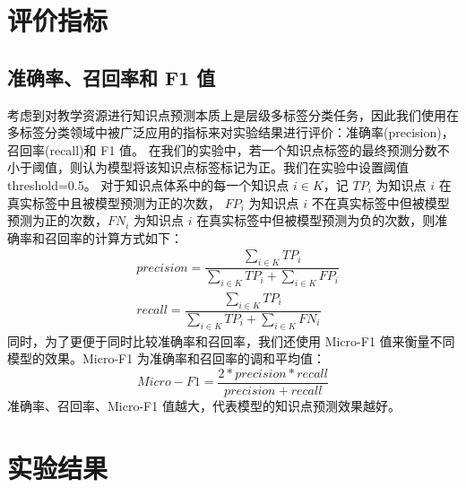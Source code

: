 \section{评价指标}
    \subsection{准确率、召回率和 F1 值}
    考虑到对教学资源进行知识点预测本质上是层级多标签分类任务，因此我们使用在多标签分类领域中被广泛应用的指标来对实验结果进行评价：准确率(precision)，召回率(recall)和 F1 值。
    在我们的实验中，若一个知识点标签的最终预测分数不小于阈值，则认为模型将该知识点标签标记为正。我们在实验中设置阈值 threshold=0.5。
    对于知识点体系中的每一个知识点 $i \in K$，记 $TP_i$ 为知识点 $i$ 在真实标签中且被模型预测为正的次数，
    $FP_i$ 为知识点 $i$ 不在真实标签中但被模型预测为正的次数，$FN_i$ 为知识点 $i$ 在真实标签中但被模型预测为负的次数，则准确率和召回率的计算方式如下：
    \begin{equation}
        \begin{aligned}
            &precision = \dfrac{\sum_{i \in K}TP_i}{\sum_{i \in K}TP_i + \sum_{i \in K}FP_i} \\
            &recall = \dfrac{\sum_{i \in K}TP_i}{\sum_{i \in K}TP_i + \sum_{i \in K}FN_i}
        \end{aligned}
    \end{equation}
    同时，为了更便于同时比较准确率和召回率，我们还使用 Micro-F1 值来衡量不同模型的效果。Micro-F1 为准确率和召回率的调和平均值：
    \begin{equation}
        Micro-F1 = \dfrac{2 * precision * recall}{precision + recall}
    \end{equation}
    准确率、召回率、Micro-F1 值越大，代表模型的知识点预测效果越好。


\section{实验结果}
